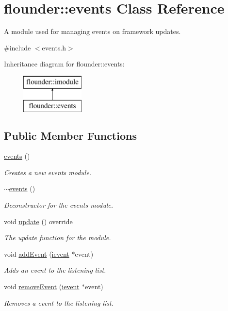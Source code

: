 \hypertarget{classflounder_1_1events}{}\section{flounder\+:\+:events Class Reference}
\label{classflounder_1_1events}


A module used for managing events on framework updates.  




{\ttfamily \#include $<$events.\+h$>$}

Inheritance diagram for flounder\+:\+:events\+:\begin{figure}[H]
\begin{center}
\leavevmode
\includegraphics[height=2.000000cm]{classflounder_1_1events}
\end{center}
\end{figure}
\subsection*{Public Member Functions}
\begin{DoxyCompactItemize}
\item 
\hyperlink{classflounder_1_1events_ae354f15876d95e28706b1d96dcd790af}{events} ()
\begin{DoxyCompactList}\small\item\em Creates a new events module. \end{DoxyCompactList}\item 
\hyperlink{classflounder_1_1events_aaf446dc74703b8ce1c04f5cf8cb06eed}{$\sim$events} ()
\begin{DoxyCompactList}\small\item\em Deconstructor for the events module. \end{DoxyCompactList}\item 
void \hyperlink{classflounder_1_1events_a7fc08fdb5dc615a924dd0d55996747dc}{update} () override
\begin{DoxyCompactList}\small\item\em The update function for the module. \end{DoxyCompactList}\item 
void \hyperlink{classflounder_1_1events_a6cb8ff41cf2fbf6a92ca78c122f07eb9}{add\+Event} (\hyperlink{classflounder_1_1ievent}{ievent} $\ast$event)
\begin{DoxyCompactList}\small\item\em Adds an event to the listening list. \end{DoxyCompactList}\item 
void \hyperlink{classflounder_1_1events_a957a88d282b2caa50cc87bbe039de095}{remove\+Event} (\hyperlink{classflounder_1_1ievent}{ievent} $\ast$event)
\begin{DoxyCompactList}\small\item\em Removes a event to the listening list. \end{DoxyCompactList}\end{DoxyCompactItemize}
